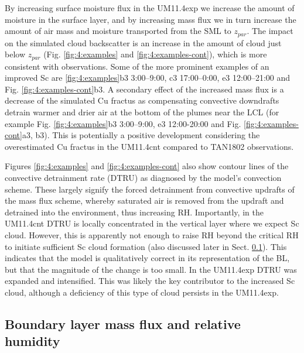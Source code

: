 By increasing surface moisture flux in the UM11.4exp we increase
the amount of moisture in the surface layer, and by increasing mass
flux we in turn increase the amount of air mass and moisture transported
from the SML to $z_{par}$. The impact on the simulated
cloud backscatter is an increase in the amount of cloud just below $z_{par}$ (Fig.
\ref{fig:4:examples} and \ref{fig:4:examples-cont}),
which is more consistent with observations. Some of the more
prominent examples of an improved Sc are \ref{fig:4:examples}b3 3:00--9:00, c3 17:00--0:00,
e3 12:00--21:00 and Fig. \ref{fig:4:examples-cont}b3. A secondary effect
of the increased mass flux is a decrease of the simulated Cu fractus as
compensating convective downdrafts detrain warmer and drier air at the bottom
of the plumes near the LCL (for example Fig. \ref{fig:4:examples}b3 3:00--9:00, e3 12:00-20:00
and Fig. \ref{fig:4:examples-cont}a3, b3). This is potentially a positive
development considering the overestimated Cu fractus in the UM11.4cnt compared
to TAN1802 observations.

Figures \ref{fig:4:examples} and \ref{fig:4:examples-cont} also show contour lines
of the convective detrainment rate (DTRU) as diagnosed by the model's
convection scheme. These largely signify the forced detrainment from convective
updrafts of the mass flux scheme, whereby saturated air is removed from the
updraft and detrained into the environment, thus increasing RH.
Importantly, in the UM11.4cnt DTRU is locally concentrated in the vertical layer
where we expect Sc cloud. However, this is apparently not enough to raise RH beyond the critical RH to initiate sufficient Sc cloud formation (also discussed later in Sect.
\ref{sec:4:bl-mass-flux-and-rh}).
This indicates that the model is qualitatively correct in its representation
of the BL, but that the magnitude of the change is too small. In the UM11.4exp DTRU was expanded and intensified. 
This was likely the key contributor to the increased
Sc cloud, although a deficiency of this type of cloud persists in the
UM11.4exp.


\subsection{Boundary layer mass flux and relative humidity}
\label{sec:4:bl-mass-flux-and-rh}

